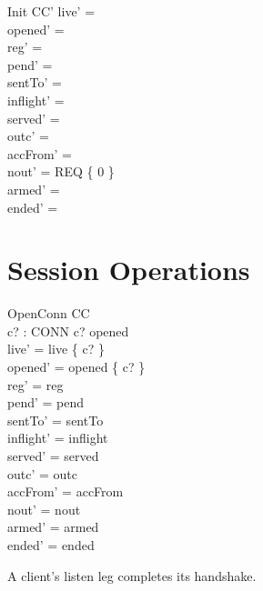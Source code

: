 \documentclass[a4paper,10pt,fleqn]{article}
\begin{document}
\begin{schema}{Init}
  CC'
\where
  live' = \emptyset \\
  opened' = \emptyset \\
  reg' = \emptyset \\
  pend' = \emptyset \\
  sentTo' = \emptyset \\
  inflight' = \emptyset \\
  served' = \emptyset \\
  outc' = \emptyset \\
  accFrom' = \emptyset \\
  nout' = REQ \cross \{ 0 \} \\
  armed' = \emptyset \\
  ended' = \emptyset
\end{schema}

\section{Session Operations}

\begin{schema}{OpenConn}
  \Delta CC \\
  c? : CONN
\where
  c? \notin opened \\
  live' = live \cup \{ c? \} \\
  opened' = opened \cup \{ c? \} \\
  reg' = reg \\
  pend' = pend \\
  sentTo' = sentTo \\
  inflight' = inflight \\
  served' = served \\
  outc' = outc \\
  accFrom' = accFrom \\
  nout' = nout \\
  armed' = armed \\
  ended' = ended
\end{schema}

A client's listen leg completes its handshake.
\end{document}
